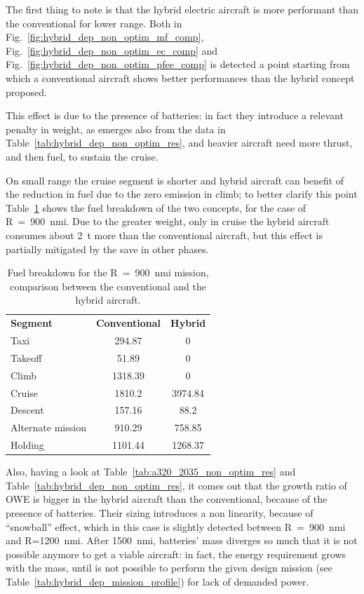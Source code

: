 The first thing to note is that the hybrid electric aircraft is more performant than the conventional for lower range. 
Both in Fig.~\ref{fig:hybrid_dep_non_optim_mf_comp}, Fig.~\ref{fig:hybrid_dep_non_optim_ec_comp} and Fig.~\ref{fig:hybrid_dep_non_optim_pfee_comp} is detected a point starting from which a conventional aircraft shows better performances than the hybrid concept proposed. 

This effect is due to the presence of batteries: in fact they introduce a relevant penalty in weight, as emerges also from the data in Table~\ref{tab:hybrid_dep_non_optim_res}, and heavier aircraft need more thrust, and then fuel, to sustain the cruise. 

On small range the cruise segment is shorter and hybrid aircraft can benefit of the reduction in fuel due to the zero emission in climb; to better clarify this point Table~\ref{tab:hybrid_dep_non_optim_fuel_breakdown} shows the fuel breakdown of the two concepts, for the case of R~=~900~nmi.
Due to the greater weight, only in cruise the hybrid aircraft consumes about 2~\si{\tonne} more than the conventional aircraft, but this effect is partially mitigated by the save in other phases. 
\begin{table}[!h]
	\centering
	\begin{tabular}{l c c}
		\hline
		\textbf{Segment} & \textbf{Conventional} & \textbf{Hybrid} \\
		Taxi & 294.87 & 0 \\
		Takeoff & 51.89 & 0 \\
		Climb & 1318.39 & 0 \\
		Cruise & 1810.2 & 3974.84 \\
		Descent & 157.16 & 88.2 \\
		Alternate mission & 910.29 & 758.85 \\
		Holding & 1101.44 & 1268.37 \\
		\hline
	\end{tabular}
	\caption{Fuel breakdown for the R~=~900~nmi mission, comparison between the conventional and the hybrid aircraft.}
	\label{tab:hybrid_dep_non_optim_fuel_breakdown}
\end{table}

Also, having a look at Table~\ref{tab:a320_2035_non_optim_res} and Table~\ref{tab:hybrid_dep_non_optim_res}, it comes out that the growth ratio of OWE is bigger in the hybrid aircraft than the conventional, because of the presence of batteries. 
Their sizing introduces a non linearity, because of ``snowball'' effect, which in this case is slightly detected between R~=~900~nmi and R=1200~nmi. 
After 1500~nmi, batteries' mass diverges so much that it is not possible anymore to get a viable aircraft: in fact, the energy requirement grows with the mass, until is not possible to perform the given design mission (see Table~\ref{tab:hybrid_dep_mission_profile}) for lack of demanded power. 

